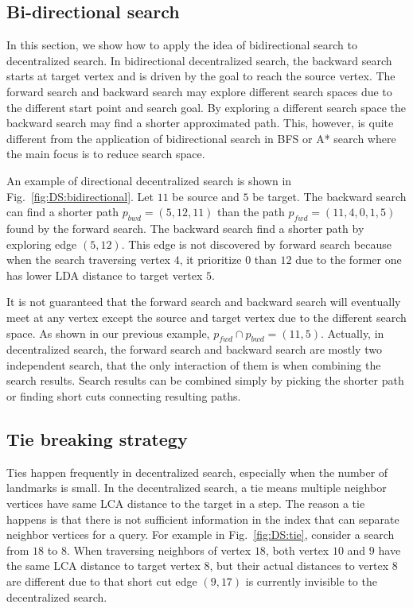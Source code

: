 \subsection{Bi-directional search}

In this section, we show how to apply the idea of bidirectional search to decentralized search. In bidirectional decentralized search, the backward search starts at target vertex and is driven by the goal to reach the source vertex. The forward search and backward search may explore different search spaces due to the different start point and search goal. By exploring a different search space  the backward search may find a shorter approximated path. This, however, is quite different from the application of bidirectional search in BFS or A* search where the main focus is to reduce search space. 

An example of directional decentralized search is shown in Fig.~\ref{fig:DS:bidirectional}. Let $11$ be source and $5$ be target. The backward search can find a shorter path $p_{bwd} = (5, 12, 11)$ than the path $p_{fwd} = (11, 4, 0, 1, 5)$ found by the forward search. The backward search find a shorter path by exploring edge $(5, 12)$. This edge is not discovered by forward search because when the search traversing vertex $4$, it prioritize $0$ than $12$ due to the former one has lower LDA distance to target vertex $5$. 

It is not guaranteed that the forward search and backward search will eventually meet at any vertex except the source and target vertex due to the different search space. As shown in our previous example, $p_{fwd} \cap p_{bwd} = (11, 5)$. Actually, in decentralized search, the forward search and backward search are mostly two independent search, that the only interaction of them is when combining the search results. Search results can be combined simply by picking the shorter path or finding short cuts connecting resulting paths. 

\subsection{Tie breaking strategy}

Ties happen frequently in decentralized search, especially when the number of landmarks is small. In the decentralized search, a tie means multiple neighbor vertices have same LCA distance to the target in a step. The reason a tie happens is that there is not sufficient information in the index that can separate neighbor vertices for a query. For example in Fig.~\ref{fig:DS:tie}, consider a search from $18$ to $8$. When traversing neighbors of vertex $18$, both vertex $10$ and $9$ have the same LCA distance to target vertex $8$, but their actual distances to vertex $8$ are different due to that short cut edge $(9, 17)$ is currently invisible to the decentralized search. 


